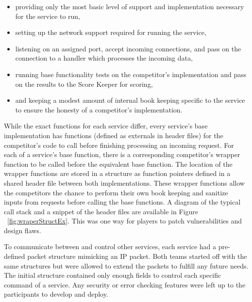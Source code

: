 \documentclass[10pt]{article}
\begin{document}
\begin{itemize}
    \item providing only the most basic level of support and implementation
    necessary for the service to run, 
    \item setting up the network support required for running the service,
    \item listening on an assigned port, accept incoming connections, and pass
    on the connection to a handler which processes the incoming data,
    \item running base functionality tests on the competitor's implementation and
    pass on the results to the Score Keeper for scoring,
    \item and keeping a modest amount of internal book keeping specific to the
    service to ensure the honesty of a competitor's implementation.
\end{itemize}

While the exact functions for each service differ, every service's base
implementation has functions (defined as externals in header files)
for the competitor's code to call before finishing processing an incoming
request. For each of a service's base function, there is a corresponding
competitor's wrapper function to be called before the equivalent base function.
The location of the wrapper functions are stored in a structure as function
pointers defined in a shared header file between both implementations. These
wrapper functions allow the competitors the chance to perform their own book
keeping and sanitize inputs from requests before calling the base functions. A
diagram of the typical call stack and a snippet of the header files are
available in Figure ~\ref{fig:wraperStructEx}. This was one way for players to
patch vulnerabilities and design flaws.

To communicate between and control other services, each service had a
pre-defined packet structure mimicking an IP packet. Both teams started off with
the same structures but were allowed to extend the packets to fulfill any
future needs. The initial structure contained only enough fields to control each
specific command of a service. Any security or error checking features were left
up to the participants to develop and deploy. 
\end{document}
